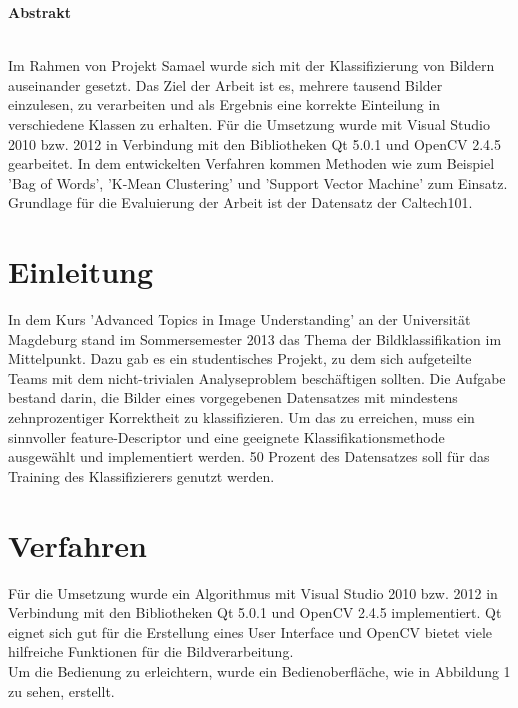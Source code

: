 \documentclass[liststotoc,11pt,a4paper]{article}
\begin{document}
\thispagestyle{empty}
\newpage
\tableofcontents                %
\setcounter{page}{1}
\newpage

\Large \bfseries Abstrakt\\
\normalsize \mdseries
{}
\normalfont
\\Im Rahmen von Projekt Samael wurde sich mit der Klassifizierung von Bildern auseinander gesetzt. Das Ziel der Arbeit ist es, mehrere tausend Bilder einzulesen, zu verarbeiten und als Ergebnis eine korrekte Einteilung in verschiedene Klassen zu erhalten. Für die Umsetzung wurde mit Visual Studio 2010 bzw. 2012 in Verbindung mit den Bibliotheken Qt 5.0.1 und OpenCV 2.4.5 gearbeitet. In dem entwickelten Verfahren kommen Methoden wie zum Beispiel 'Bag of Words', 'K-Mean Clustering' und 'Support Vector Machine' zum Einsatz. %
Grundlage für die Evaluierung der Arbeit ist der Datensatz der Caltech101. 

\section{Einleitung}
In dem Kurs 'Advanced Topics in Image Understanding' an der Universität Magdeburg stand im Sommersemester 2013 das Thema der Bildklassifikation im Mittelpunkt. Dazu gab es ein studentisches Projekt, zu dem sich aufgeteilte Teams mit dem nicht-trivialen Analyseproblem beschäftigen sollten. Die Aufgabe bestand darin, die Bilder eines vorgegebenen Datensatzes mit mindestens zehnprozentiger Korrektheit zu klassifizieren. 
Um das zu erreichen, muss ein sinnvoller feature-Descriptor und eine geeignete Klassifikationsmethode ausgewählt und implementiert werden. 50 Prozent des Datensatzes soll für das Training des Klassifizierers genutzt werden.

\section{Verfahren}
Für die Umsetzung wurde ein Algorithmus mit Visual Studio 2010 bzw. 2012 in Verbindung mit den Bibliotheken Qt 5.0.1 und OpenCV 2.4.5 implementiert. Qt eignet sich gut für die Erstellung eines User Interface und OpenCV bietet viele hilfreiche Funktionen für die Bildverarbeitung.\\Um die Bedienung zu erleichtern, wurde ein Bedienoberfläche, wie in Abbildung 1 zu sehen, erstellt.
\end{document}
